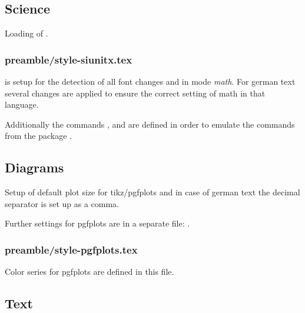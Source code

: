 \subsection{Science}

Loading of .


\subsubsection{preamble/style-siunitx.tex}

 is setup for the detection of all font changes and in mode \emph{math}. For german text several changes are applied to ensure the correct setting of math in that language.

Additionally the commands ,  and  are defined in order to emulate the commands from the package .


\subsection{Diagrams}

Setup of default plot size for tikz/pgfplots and in case of german text the decimal separator is set up as a comma.

Further settings for pgfplots are in a separate file: 
.


\subsubsection{preamble/style-pgfplots.tex}

Color series for pgfplots are defined in this file.


\subsection{Text}

